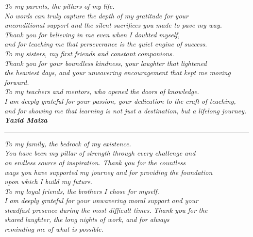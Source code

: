 \documentclass[a4paper,12pt]{report}
\begin{document}
\begin{center}
    {\itshape
        \vspace*{0.5cm}%
        To my parents, the pillars of my life.\\
        No words can truly capture the depth of my gratitude for your \\
        unconditional support and the silent sacrifices you made to pave my way.\\
        Thank you for believing in me even when I doubted myself, \\
        and for teaching me that perseverance is the quiet engine of success. \\[0.8em]
        To my sisters, my first friends and constant companions.\\
        Thank you for your boundless kindness, your laughter that lightened \\
        the heaviest days, and your unwavering encouragement that kept me moving forward. \\[0.8em]
        To my teachers and mentors, who opened the doors of knowledge.\\
        I am deeply grateful for your passion, your dedication to the craft of teaching, \\
        and for showing me that learning is not just a destination, but a lifelong journey. \\[1.5em]

        \textbf{Yazid Maiza}
    }

    \vspace{0.5cm} %
    \rule{0.4\textwidth}{0.4pt} %
    \vspace{0.5cm}

    {\itshape
        To my family, the bedrock of my existence.\\
        You have been my pillar of strength through every challenge and \\
        an endless source of inspiration. Thank you for the countless \\
        ways you have supported my journey and for providing the foundation \\
        upon which I build my future. \\[0.8em]
        
        To my loyal friends, the brothers I chose for myself.\\
        I am deeply grateful for your unwavering moral support and your \\
        steadfast presence during the most difficult times. Thank you for the \\
        shared laughter, the long nights of work, and for always \\
        reminding me of what is possible. \\[0.8em]
        
}
\end{center}
\end{document}
